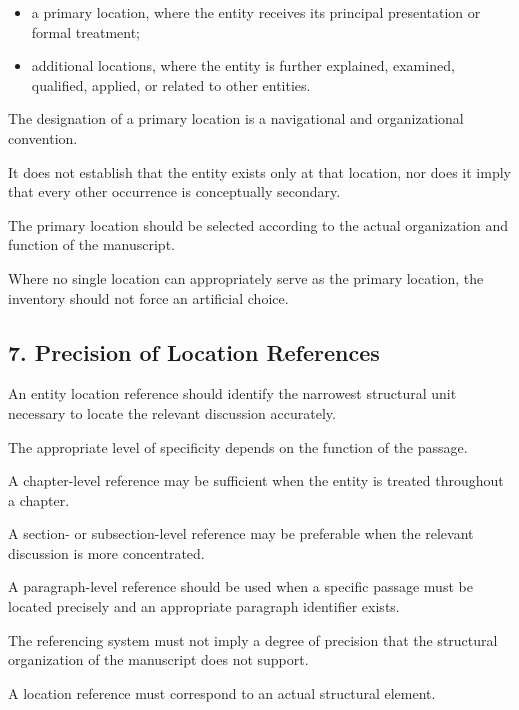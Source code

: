 \begin{itemize}
    \item a primary location,
    where the entity receives
    its principal presentation
    or formal treatment;

    \item additional locations,
    where the entity is further
    explained, examined,
    qualified, applied, or
    related to other entities.
\end{itemize}

The designation of a primary
location is a navigational
and organizational convention.

It does not establish that
the entity exists only at
that location, nor does it
imply that every other
occurrence is conceptually
secondary.

The primary location should
be selected according to
the actual organization and
function of the manuscript.

Where no single location
can appropriately serve
as the primary location,
the inventory should not
force an artificial choice.


\subsection*{7. Precision of Location References}

An entity location reference
should identify the narrowest
structural unit necessary
to locate the relevant
discussion accurately.

The appropriate level of
specificity depends on
the function of the passage.

A chapter-level reference
may be sufficient when
the entity is treated
throughout a chapter.

A section- or subsection-level
reference may be preferable
when the relevant discussion
is more concentrated.

A paragraph-level reference
should be used when a specific
passage must be located
precisely and an appropriate
paragraph identifier exists.

The referencing system must
not imply a degree of precision
that the structural organization
of the manuscript does not
support.

A location reference must
correspond to an actual
structural element.

